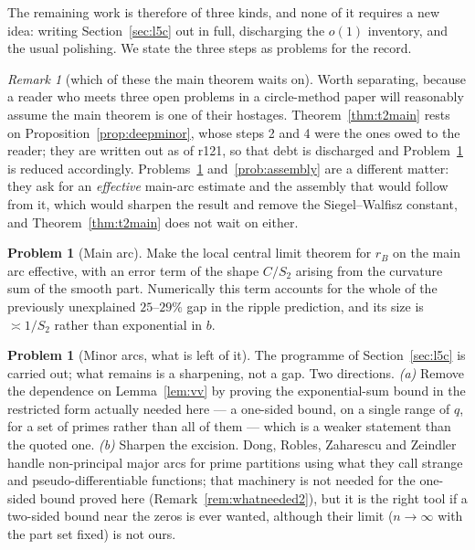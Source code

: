 \documentclass[11pt,a4paper]{article}
\theoremstyle{plain}
\theoremstyle{definition}
\newtheorem{problem}[theorem]{Problem}
\theoremstyle{remark}
\newtheorem{remark}[theorem]{Remark}
\begin{document}
\noindent
The remaining work is therefore of three kinds, and none of it requires a new
idea: writing Section~\ref{sec:l5c} out in full, discharging the $o(1)$
inventory, and the usual polishing. We state the
three steps as problems for the record.

\begin{remark}[which of these the main theorem waits on]\label{rem:whichwait}
Worth separating, because a reader who meets three open problems in a
circle-method paper will reasonably assume the main theorem is one of their
hostages. Theorem~\ref{thm:t2main} rests on
Proposition~\ref{prop:deepminor}, whose steps 2 and 4 were the ones owed to the
reader; they are written out as of r121, so that debt is discharged and
Problem~\ref{prob:minor} is reduced accordingly. Problems~\ref{prob:main}
and~\ref{prob:assembly} are a different matter: they ask for an
\emph{effective} main-arc estimate and the assembly that would follow from it,
which would sharpen the result and remove the Siegel--Walfisz constant, and
Theorem~\ref{thm:t2main} does not wait on either.
\end{remark}

\begin{problem}[Main arc]\label{prob:main}
Make the local central limit theorem for $r_B$ on the main arc effective, with
an error term of the shape $C/S_2$ arising from the curvature sum of the smooth
part. Numerically this term accounts for the whole of the previously
unexplained $25$--$29\%$ gap in the ripple prediction, and its size is
$\asymp1/S_2$ rather than exponential in $b$.
\end{problem}

\begin{problem}[Minor arcs, what is left of it]\label{prob:minor}
The programme of Section~\ref{sec:l5c} is carried out; what remains is a
sharpening, not a gap. Two directions. \emph{(a)} Remove the dependence on
Lemma~\ref{lem:vv} by proving the exponential-sum bound in the restricted form
actually needed here --- a one-sided bound, on a single range of $q$, for a set
of primes rather than all of them --- which is a weaker statement than the
quoted one. \emph{(b)} Sharpen the excision. Dong, Robles, Zaharescu and
Zeindler~\cite{DRZZ25} handle non-principal major arcs for prime partitions
using what they call strange and pseudo-differentiable functions; that machinery
is not needed for the one-sided bound proved here
(Remark~\ref{rem:whatneeded2}), but it is the right tool if a two-sided bound
near the zeros is ever wanted, although their limit ($n\to\infty$ with the part
set fixed) is not ours.
\end{problem}
\end{document}
